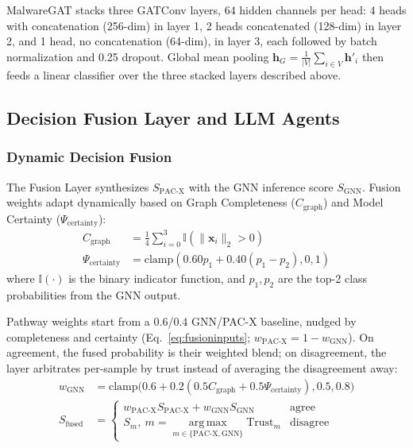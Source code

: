 \documentclass[conference]{IEEEtran}
\begin{document}
MalwareGAT stacks three GATConv layers, 64 hidden channels per head: 4 heads with concatenation (256-dim) in layer 1, 2 heads concatenated (128-dim) in layer 2, and 1 head, no concatenation (64-dim), in layer 3, each followed by batch normalization and 0.25 dropout. Global mean pooling $\mathbf{h}_{G} = \frac{1}{|V|} \sum_{i \in V}\mathbf{h}'_i$ then feeds a linear classifier over the three stacked layers described above.

\subsection{Decision Fusion Layer and LLM Agents}

\subsubsection{Dynamic Decision Fusion}
The Fusion Layer synthesizes $S_{\text{PAC-X}}$ with the GNN inference score $S_{\text{GNN}}$. Fusion weights adapt dynamically based on Graph Completeness ($C_{\text{graph}}$) and Model Certainty ($\Psi_{\text{certainty}}$):
\begin{equation}
\label{eq:fusioninputs}
\begin{aligned}
C_{\text{graph}} &= \frac{1}{4}\sum_{i=0}^3 \mathbb{I}(\|\mathbf{x}_i\|_2 > 0) \\
\Psi_{\text{certainty}} &= \text{clamp}\left(0.60 p_1 + 0.40 (p_1 - p_2), 0, 1\right)
\end{aligned}
\end{equation}
where $\mathbb{I}(\cdot)$ is the binary indicator function, and $p_1, p_2$ are the top-2 class probabilities from the GNN output.

Pathway weights start from a 0.6/0.4 GNN/PAC-X baseline, nudged by completeness and certainty (Eq.~\ref{eq:fusioninputs}; $w_{\text{PAC-X}} = 1 - w_{\text{GNN}}$). On agreement, the fused probability is their weighted blend; on disagreement, the layer arbitrates per-sample by trust instead of averaging the disagreement away:
\begin{equation}
\label{eq:fusion}
\begin{aligned}
w_{\text{GNN}} &= \text{clamp}\big(0.6 {+} 0.2(0.5 C_{\text{graph}} {+} 0.5 \Psi_{\text{certainty}}), 0.5, 0.8\big) \\
S_{\text{fused}} &=
\begin{cases}
w_{\text{PAC-X}} S_{\text{PAC-X}} + w_{\text{GNN}} S_{\text{GNN}} & \text{agree} \\
S_m,\ m = \operatorname*{arg\,max}\limits_{m \in \{\text{PAC-X}, \text{GNN}\}} \text{Trust}_m & \text{disagree}
\end{cases}
\end{aligned}
\end{equation}
\end{document}
